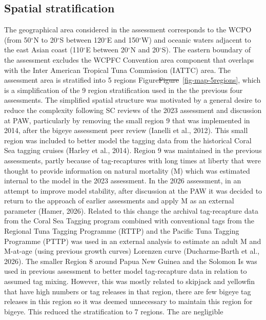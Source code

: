 \documentclass[
  english,
  a4paper,
  a4paper,
  11pt]{SCreport}
\providecommand{\DIFdel}[1]{{\protect\color{red}\sout{#1}}}                      %
\providecommand{\DIFdelbegin}{} %
\providecommand{\DIFdelend}{} %
\newcommand{\DIFscaledelfig}{0.5}
\newlength{\DIFdelgraphicswidth} %
\newlength{\DIFdelgraphicsheight} %
\newcommand{\DIFdelincludegraphics}[2][]{%
\sbox{\DIFdelgraphicsbox}{\DIFOincludegraphics[#1]{#2}}%
\settoboxwidth{\DIFdelgraphicswidth}{\DIFdelgraphicsbox} %
\settoboxtotalheight{\DIFdelgraphicsheight}{\DIFdelgraphicsbox} %
\scalebox{\DIFscaledelfig}{%
\parbox[b]{\DIFdelgraphicswidth}{\usebox{\DIFdelgraphicsbox}\\[-\baselineskip] \rule{\DIFdelgraphicswidth}{0em}}\llap{\resizebox{\DIFdelgraphicswidth}{\DIFdelgraphicsheight}{%
\setlength{\unitlength}{\DIFdelgraphicswidth}%
\begin{picture}(1,1)%
\thicklines\linethickness{2pt} %
{\color[rgb]{1,0,0}\put(0,0){\framebox(1,1){}}}%
{\color[rgb]{1,0,0}\put(0,0){\line( 1,1){1}}}%
{\color[rgb]{1,0,0}\put(0,1){\line(1,-1){1}}}%
\end{picture}%
}\hspace*{3pt}}} %
} %
\DeclareRobustCommand{\DIFdelbegin}{\DIFOdelbegin \let\includegraphics\DIFdelincludegraphics} %
\DeclareRobustCommand{\DIFdelend}{\DIFOaddend \let\includegraphics\DIFOincludegraphics} %
\begin{document}
\subsection{Spatial stratification}\label{sec-spatial-stratification}

The geographical area considered in the assessment corresponds to the
WCPO (from 50\(^\circ\)N to 20\(^\circ\)S between 120\(^\circ\)E and
150\(^\circ\)W) and oceanic waters adjacent to the east Asian coast
(110\(^\circ\)E between 20\(^\circ\)N and 20\(^\circ\)S). The eastern
boundary of the assessment excludes the WCPFC Convention area component
that overlaps with the Inter American Tropical Tuna Commission (IATTC)
area. The assessment area is stratified into 5 regions
Figure\DIFdelbegin \DIFdel{Figure}\DIFdelend ~\ref{fig-map-5regions}, which is a simplification of the 9 region
stratification used in the the previous four assessments. The simplified
spatial structure was motivated by a general desire to reduce the
complexity following SC reviews of the 2023 assessment and discussion at
PAW, particularly by removing the small region 9 that was implemented in
2014, after the bigeye assessment peer review (Ianelli et al., 2012).
This small region was included to better model the tagging data from the
historical Coral Sea tagging cruises (Harley et al., 2014). Region 9 was
maintained in the previous assessments, partly because of tag-recaptures
with long times at liberty that were thought to provide information on
natural mortality (M) which was estimated internal to the model in the
2023 assessment. In the 2026 assessment, in an attempt to improve model
stability, after discussion at the PAW it was decided to return to the
approach of earlier assessments and apply M as an external parameter
(Hamer, 2026). Related to this change the archival tag-recapture data
from the Coral Sea Tagging program combined with conventional tags from
the Regional Tuna Tagging Programme (RTTP) and the Pacific Tuna Tagging
Programme (PTTP) was used in an external analysis to estimate an adult M
and M-at-age (using previous growth curves) Lorenzen curve
(Ducharme-Barth et al., 2026). The smaller Region 8 around Papua New
Guinea and the Solomon Is was used in previous assessment to better
model tag-recapture data in relation to assumed tag mixing. However,
this was mostly related to skipjack and yellowfin that have high numbers
or tag releases in that region, there are few bigeye tag releases in
this region so it was deemed unnecessary to maintain this region for
bigeye. This reduced the stratification to 7 regions. The are negligible
\end{document}
